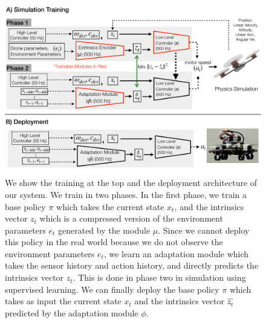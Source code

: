 \begin{figure}
\centering
\includegraphics[width=\linewidth]{img/method-figures-no-last-act.pdf}
\caption{We show the training at the top and the deployment architecture of our system. We train in two phases. In the first phase, we train a base policy $\pi$ which takes the current state $x_t$, and the intrinsics vector $z_t$ which is a compressed version of the environment parameters $e_t$ generated by the module $\mu$. Since we cannot deploy this policy in the real world because we do not observe the environment parameters $e_t$, we learn an adaptation module which takes the sensor history and action history, and directly predicts the intrinsics vector $z_t$. This is done in phase two in simulation using supervised learning. We can finally deploy the base policy $\pi$ which takes as input the current state $x_t$ and the intrinsics vector $\hat{z_t}$ predicted by the adaptation module $\phi$.}
\label{fig:method}
\end{figure}

